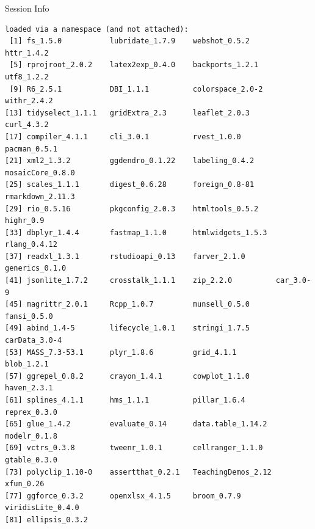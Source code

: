 \documentclass[10pt]{beamer}\usepackage[]{graphicx}\usepackage[]{color}
\makeatletter
\newenvironment{kframe}{%
 \def\at@end@of@kframe{}%
 \ifinner\ifhmode%
  \def\at@end@of@kframe{\end{minipage}}%
  \begin{minipage}{\columnwidth}%
 \fi\fi%
 \def\FrameCommand##1{\hskip\@totalleftmargin \hskip-\fboxsep
 \colorbox{shadecolor}{##1}\hskip-\fboxsep
     \hskip-\linewidth \hskip-\@totalleftmargin \hskip\columnwidth}%
 \MakeFramed {\advance\hsize-\width
   \@totalleftmargin\z@ \linewidth\hsize
   \@setminipage}}%
 {\par\unskip\endMakeFramed%
 \at@end@of@kframe}
\newenvironment{knitrout}{}{} %
\makeatother
\begin{document}
\begin{frame}[fragile]{Session Info}
\begin{knitrout}
\begin{kframe}
\begin{verbatim}
loaded via a namespace (and not attached):
 [1] fs_1.5.0           lubridate_1.7.9    webshot_0.5.2      httr_1.4.2        
 [5] rprojroot_2.0.2    latex2exp_0.4.0    backports_1.2.1    utf8_1.2.2        
 [9] R6_2.5.1           DBI_1.1.1          colorspace_2.0-2   withr_2.4.2       
[13] tidyselect_1.1.1   gridExtra_2.3      leaflet_2.0.3      curl_4.3.2        
[17] compiler_4.1.1     cli_3.0.1          rvest_1.0.0        pacman_0.5.1      
[21] xml2_1.3.2         ggdendro_0.1.22    labeling_0.4.2     mosaicCore_0.8.0  
[25] scales_1.1.1       digest_0.6.28      foreign_0.8-81     rmarkdown_2.11.3  
[29] rio_0.5.16         pkgconfig_2.0.3    htmltools_0.5.2    highr_0.9         
[33] dbplyr_1.4.4       fastmap_1.1.0      htmlwidgets_1.5.3  rlang_0.4.12      
[37] readxl_1.3.1       rstudioapi_0.13    farver_2.1.0       generics_0.1.0    
[41] jsonlite_1.7.2     crosstalk_1.1.1    zip_2.2.0          car_3.0-9         
[45] magrittr_2.0.1     Rcpp_1.0.7         munsell_0.5.0      fansi_0.5.0       
[49] abind_1.4-5        lifecycle_1.0.1    stringi_1.7.5      carData_3.0-4     
[53] MASS_7.3-53.1      plyr_1.8.6         grid_4.1.1         blob_1.2.1        
[57] ggrepel_0.8.2      crayon_1.4.1       cowplot_1.1.0      haven_2.3.1       
[61] splines_4.1.1      hms_1.1.1          pillar_1.6.4       reprex_0.3.0      
[65] glue_1.4.2         evaluate_0.14      data.table_1.14.2  modelr_0.1.8      
[69] vctrs_0.3.8        tweenr_1.0.1       cellranger_1.1.0   gtable_0.3.0      
[73] polyclip_1.10-0    assertthat_0.2.1   TeachingDemos_2.12 xfun_0.26         
[77] ggforce_0.3.2      openxlsx_4.1.5     broom_0.7.9        viridisLite_0.4.0 
[81] ellipsis_0.3.2    
\end{verbatim}
\end{kframe}
\end{knitrout}
	
\end{frame}
\end{document}
